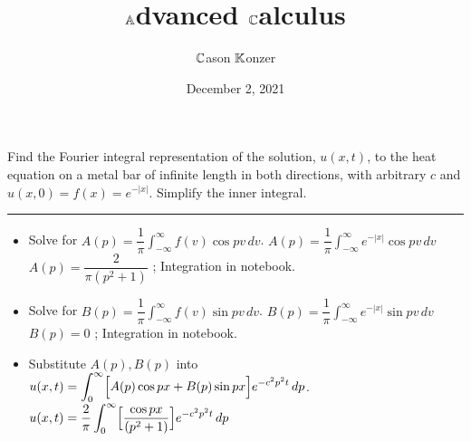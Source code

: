 \documentclass[10pt]{article}
\title{$\mathbb{A}$dvanced $\mathbb{C}$alculus}
\author{$\mathbb{C}$ason $\mathbb{K}$onzer}
\date{December 2, 2021}
\begin{document}
\maketitle

\newpage

\section{\underline{}}
\label{sec: Problem 1}

\noindent
Find the Fourier integral representation of the solution, $ u(x,t) $, 
to the heat equation on a metal bar of infinite length in both directions, 
with arbitrary $ c $ and $ u(x,0) = f(x) = e^{-|x|} $. Simplify the inner integral. \\
\vspace{2.5mm}

\hrule 

\vspace{7.5mm}

\begin{itemize}
    \item Solve for $ \displaystyle A(p) = \dfrac{1}{\pi} \int_{-\infty}^{\infty} f(v)\cos{pv} \,dv $.
    \subitem $ \displaystyle A(p) = \dfrac{1}{\pi} \int_{-\infty}^{\infty} e^{-|x|}\cos{pv} \,dv $
    \subitem $ \displaystyle A(p) = \dfrac{2}{\pi(p^2 + 1)} $ ; Integration in notebook. 
    \item Solve for $ \displaystyle B(p) = \dfrac{1}{\pi} \int_{-\infty}^{\infty} f(v)\sin{pv} \,dv $.
    \subitem $ \displaystyle B(p) = \dfrac{1}{\pi} \int_{-\infty}^{\infty} e^{-|x|}\sin{pv} \,dv $
    \subitem $ \displaystyle B(p) = 0 $ ; Integration in notebook.
    \item Substitute $ A(p), B(p) $ into $ \displaystyle u(x,t) = \int_{0}^{\infty} \Bigl[ A(p)\cos{px} + B(p)\sin{px} \Bigr] e^{-c^2p^2t} \, dp $.
    \subitem $ \displaystyle u(x,t) = \dfrac{2}{\pi} \int_{0}^{\infty} \Bigl[ \dfrac{\cos{px}}{(p^2 + 1)} \Bigr] e^{-c^2p^2t} \, dp $
\end{itemize}

\newpage

\section{\underline{}}
\label{sec: Problem 2}
\end{document}
